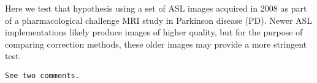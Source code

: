 Here we test that hypothesis using a set of ASL images acquired in 2008 as part of a pharmacological challenge MRI study in Parkinson disease (PD).\cite{Black_2010} Newer ASL implementations likely produce images of higher quality, but for the purpose of comparing correction methods, these older images may provide a more stringent test.

\verb|See two comments.|